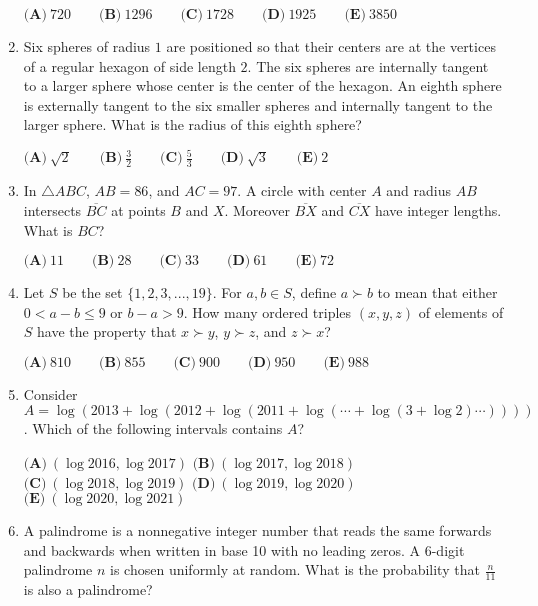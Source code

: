 \documentclass{article}
\begin{document}
\begin{enumerate}[label=\arabic*., itemsep=0.5em]
\( \textbf{(A)} \ 720 \qquad  \textbf{(B)} \ 1296 \qquad  \textbf{(C)} \ 1728 \qquad  \textbf{(D)} \ 1925 \qquad  \textbf{(E)} \ 3850 \)\par \vspace{0.5em}\item Six spheres of radius \(1\) are positioned so that their centers are at the vertices of a regular hexagon of side length \(2\). The six spheres are internally tangent to a larger sphere whose center is the center of the hexagon. An eighth sphere is externally tangent to the six smaller spheres and internally tangent to the larger sphere. What is the radius of this eighth sphere?

\( \textbf{(A)} \ \sqrt{2} \qquad \textbf{(B)} \ \frac{3}{2} \qquad \textbf{(C)} \ \frac{5}{3} \qquad \textbf{(D)} \ \sqrt{3} \qquad \textbf{(E)} \ 2\)\par \vspace{0.5em}\item In \( \bigtriangleup ABC \), \( AB = 86 \), and \( AC = 97 \). A circle with center \( A \) and radius \( AB \) intersects \( \overline{BC} \) at points \( B \) and \( X \). Moreover \( \overline{BX} \) and \( \overline{CX} \) have integer lengths. What is \( BC \)?

\( \textbf{(A)} \ 11 \qquad  \textbf{(B)} \ 28 \qquad  \textbf{(C)} \ 33 \qquad  \textbf{(D)} \ 61 \qquad  \textbf{(E)} \ 72 \)\par \vspace{0.5em}\item Let \(S\) be the set \(\{1,2,3,...,19\}\). For \(a,b \in S\), define \(a \succ b\) to mean that either \(0 < a - b \le 9\) or \(b - a > 9\). How many ordered triples \((x,y,z)\) of elements of \(S\) have the property that \(x \succ y\), \(y \succ z\), and \(z \succ x\)?

\( \textbf{(A)} \ 810 \qquad  \textbf{(B)} \ 855 \qquad  \textbf{(C)} \ 900 \qquad  \textbf{(D)} \ 950 \qquad  \textbf{(E)} \ 988 \)\par \vspace{0.5em}\item Consider \( A = \log (2013 + \log (2012 + \log (2011 + \log (\cdots + \log (3 + \log 2) \cdots )))) \). Which of the following intervals contains \( A \)?

\( \textbf{(A)} \ (\log 2016, \log 2017) \)
\( \textbf{(B)} \ (\log 2017, \log 2018) \)
\( \textbf{(C)} \ (\log 2018, \log 2019) \)
\( \textbf{(D)} \ (\log 2019, \log 2020) \)
\( \textbf{(E)} \ (\log 2020, \log 2021) \)\par \vspace{0.5em}\item A palindrome is a nonnegative integer number that reads the same forwards and backwards when written in base 10 with no leading zeros. A 6-digit palindrome \(n\) is chosen uniformly at random. What is the probability that \(\frac{n}{11}\) is also a palindrome?


\end{enumerate}
\end{document}
